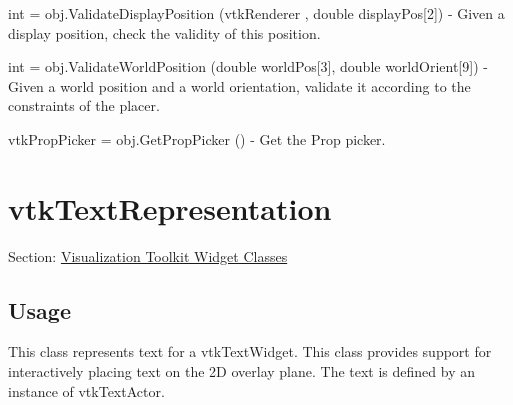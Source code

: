 \begin{DoxyItemize}
\item {\ttfamily int = obj.\-Validate\-Display\-Position (vtk\-Renderer , double display\-Pos\mbox{[}2\mbox{]})} -\/ Given a display position, check the validity of this position.  
\item {\ttfamily int = obj.\-Validate\-World\-Position (double world\-Pos\mbox{[}3\mbox{]}, double world\-Orient\mbox{[}9\mbox{]})} -\/ Given a world position and a world orientation, validate it according to the constraints of the placer.  
\item {\ttfamily vtk\-Prop\-Picker = obj.\-Get\-Prop\-Picker ()} -\/ Get the Prop picker.  
\end{DoxyItemize}\hypertarget{vtkwidgets_vtktextrepresentation}{}\section{vtk\-Text\-Representation}\label{vtkwidgets_vtktextrepresentation}
Section\-: \hyperlink{sec_vtkwidgets}{Visualization Toolkit Widget Classes} \hypertarget{vtkwidgets_vtkxyplotwidget_Usage}{}\subsection{Usage}\label{vtkwidgets_vtkxyplotwidget_Usage}
This class represents text for a vtk\-Text\-Widget. This class provides support for interactively placing text on the 2\-D overlay plane. The text is defined by an instance of vtk\-Text\-Actor.

